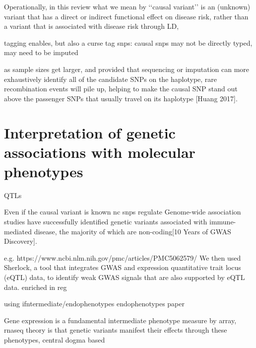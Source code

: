 \begin{outline}
Operationally, in this
review what we mean by ‘‘causal variant’’ is an
(unknown) variant that has a direct or indirect functional
effect on disease risk, rather than a variant
that is associated with disease risk through LD,

    \2 tagging enables, but also a curse
    \2 tag snps: causal snps may not be directly typed, may need to be imputed

    \2 as sample sizes get larger, and provided that sequencing or imputation can more exhaustively identify all of the candidate SNPs on the haplotype, rare recombination events will pile up, helping to make the causal SNP stand out above the passenger SNPs that usually travel on its haplotype [Huang 2017].

\section{Interpretation of genetic associations with molecular phenotypes}

QTLs

    \2 Even if the causal variant is known
    \2 nc snps regulate
        \3 Genome-wide association studies have successfully identified genetic variants associated with immune-mediated disease, the majority of which are non-coding[10 Years of GWAS Discovery].

        e.g.
            https://www.ncbi.nlm.nih.gov/pmc/articles/PMC5062579/
            We then used Sherlock, a tool that integrates GWAS and expression quantitative trait locus (eQTL) data, to identify weak GWAS signals that are also supported by eQTL data. 
    \2 enriched in reg

\1 using ifntermediate/endophenotypes
    \2 endophenotypes paper \autocite{goldman2007DeconstructionVulnerabilityComplex}

\1 Gene expression is a fundamental intermediate phenotype
        \2 measure by array, rnaseq 
    \2 theory is that genetic variants manifest their effects through these phenotypes, central dogma based


\end{outline}
